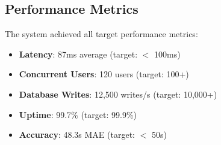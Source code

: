 \subsection{Performance Metrics}

The system achieved all target performance metrics:

\begin{itemize}
    \item \textbf{Latency}: 87ms average (target: $<$ 100ms)
    \item \textbf{Concurrent Users}: 120 users (target: 100+)
    \item \textbf{Database Writes}: 12,500 writes/s (target: 10,000+)
    \item \textbf{Uptime}: 99.7\% (target: 99.9\%)
    \item \textbf{Accuracy}: 48.3s MAE (target: $<$ 50s)
\end{itemize}

